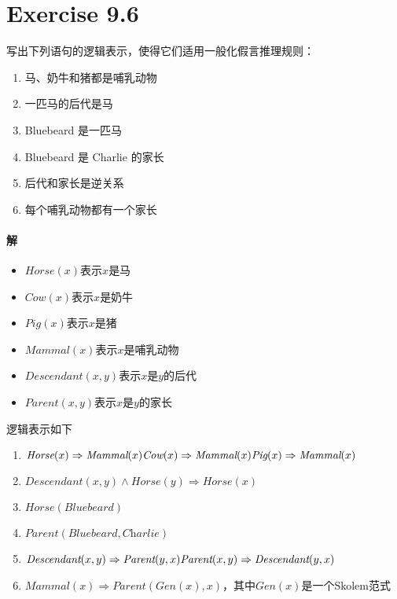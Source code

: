 \documentclass{article}
\begin{document}
\section{Exercise 9.6}
写出下列语句的逻辑表示，使得它们适用一般化假言推理规则：
\begin{enumerate}[label = \emph{\alph*}.]
    \item 马、奶牛和猪都是哺乳动物
    \item 一匹马的后代是马
    \item Bluebeard 是一匹马
    \item Bluebeard 是 Charlie 的家长
    \item 后代和家长是逆关系
    \item 每个哺乳动物都有一个家长
\end{enumerate}

\paragraph{解}
\begin{itemize}
    \item $\textit{Horse}(x)$表示$x$是马
    \item $\textit{Cow}(x)$表示$x$是奶牛
    \item $\textit{Pig}(x)$表示$x$是猪
    \item $\textit{Mammal}(x)$表示$x$是哺乳动物
    \item $\textit{Descendant}(x,y)$表示$x$是$y$的后代
    \item $\textit{Parent}(x,y)$表示$x$是$y$的家长
\end{itemize}
逻辑表示如下
\begin{enumerate}[label = \emph{\alph*}.]
    \item $\textit{Horse}(x) \Rightarrow \textit{Mammal}(x) \\ \textit{Cow}(x) \Rightarrow \textit{Mammal}(x) \\ \textit{Pig}(x) \Rightarrow \textit{Mammal}(x)$
    \item $\textit{Descendant}(x, y) \land \textit{Horse}(y) \Rightarrow \textit{Horse}(x)$
    \item $\textit{Horse}(\textit{Bluebeard})$
    \item $\textit{Parent}(\textit{Bluebeard}, \textit{Charlie})$
    \item $\textit{Descendant}(x, y) \Rightarrow \textit{Parent}(y, x) \\ \textit{Parent}(x, y) \Rightarrow \textit{Descendant}(y, x)$
    \item $\textit{Mammal}(x) \Rightarrow \textit{Parent}(\textit{Gen}(x), x)$，其中$\textit{Gen}(x)$是一个Skolem范式
\end{enumerate}
\end{document}
